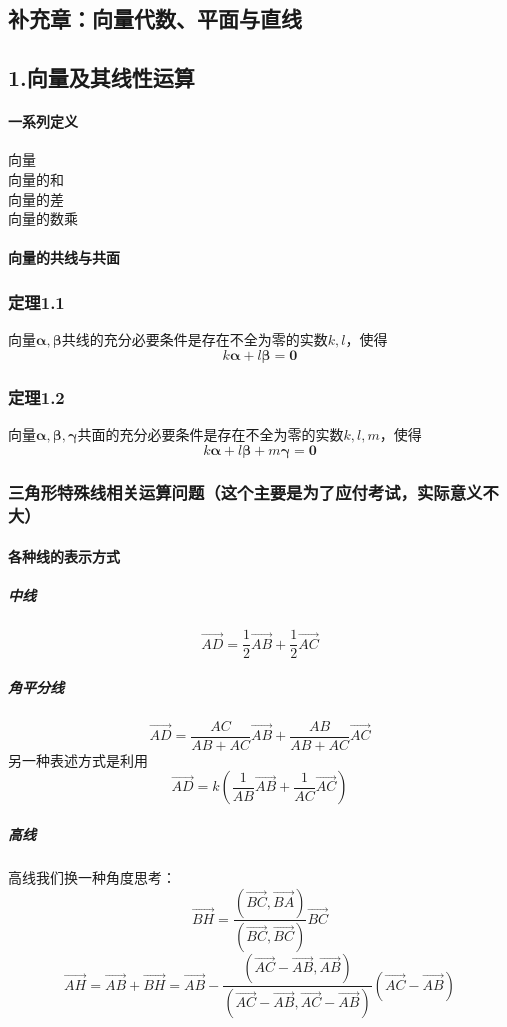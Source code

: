 \documentclass{article}
\newcommand{\ve}{\boldsymbol}
\begin{document}
\begin{CJK}{UTF8}{gkai}
\newpage
\section*{补充章：向量代数、平面与直线}

\subsection*{1.向量及其线性运算}
\paragraph{一系列定义\\}
向量\\向量的和\\向量的差\\向量的数乘\\
\paragraph{向量的共线与共面}
\subsubsection*{定理1.1}
向量$\ve{\alpha},\ve{\beta}$共线的充分必要条件是存在不全为零的实数$k,l$，使得
\[k\ve{\alpha}+l\ve{\beta}=\ve{0}\]
\subsubsection*{定理1.2}
向量$\ve{\alpha},\ve{\beta},\ve{\gamma}$共面的充分必要条件是存在不全为零的实数$k,l,m$，使得
\[k\ve{\alpha}+l\ve{\beta}+m\ve{\gamma}=\ve{0}\]
\subsubsection*{三角形特殊线相关运算问题（这个主要是为了应付考试，实际意义不大）}
\paragraph{各种线的表示方式\\}
\subparagraph{中线\\}
\[\overrightarrow{AD}=\frac{1}{2}\overrightarrow{AB}+\frac{1}{2}\overrightarrow{AC}\]
\subparagraph{角平分线\\}
\[\overrightarrow{AD}=\frac{AC}{AB+AC}\overrightarrow{AB}+\frac{AB}{AB+AC}\overrightarrow{AC}\]
另一种表述方式是利用
\[\overrightarrow{AD}=k(\frac{1}{AB}\overrightarrow{AB}+\frac{1}{AC}\overrightarrow{AC})\]
\subparagraph{高线\\}
高线我们换一种角度思考：
\[\overrightarrow{BH}=\dfrac{(\overrightarrow{BC},\overrightarrow{BA})}{(\overrightarrow{BC},\overrightarrow{BC})}\overrightarrow{BC}\]
\[\overrightarrow{AH}=\overrightarrow{AB}+\overrightarrow{BH}=\overrightarrow{AB}-\dfrac{(\overrightarrow{AC}-\overrightarrow{AB},\overrightarrow{AB})}{(\overrightarrow{AC}-\overrightarrow{AB},\overrightarrow{AC}-\overrightarrow{AB})}(\overrightarrow{AC}-\overrightarrow{AB})\]

\end{CJK}
\end{document}

